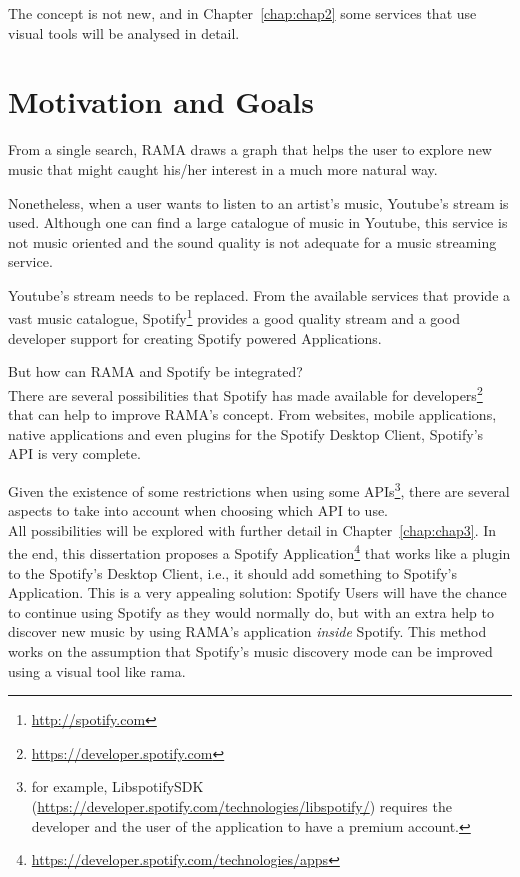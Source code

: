   The concept is not new, and in Chapter~\ref{chap:chap2} some services that use visual tools will be analysed in detail.


\section{Motivation and Goals} \label{sec:goals}

  From a single search, RAMA draws a graph that helps the user to explore new music that might caught his/her interest in a much more natural way.

  Nonetheless, when a user wants to listen to an artist's music, Youtube's stream is used.
  Although one can find a large catalogue of music in Youtube, this service is not music oriented and the sound quality is not adequate for a music streaming service.

  Youtube's stream needs to be replaced.
  From the available services that provide a vast music catalogue, Spotify\footnote{\url{http://spotify.com}} provides a good quality stream and a good developer support for creating Spotify powered Applications.

  But how can RAMA and Spotify be integrated? \\

  There are several possibilities that Spotify has made available for developers\footnote{\url{https://developer.spotify.com}} that can help to improve RAMA's concept.
  From websites, mobile applications, native applications and even plugins for the Spotify Desktop Client, Spotify's API is very complete.

  Given the existence of some restrictions when using some APIs\footnote{for example, LibspotifySDK (\url{https://developer.spotify.com/technologies/libspotify/}) requires the developer and the user of the application to have a premium account.}, there are several aspects to take into account when choosing which API to use. \\

  All possibilities will be explored with further detail in Chapter~\ref{chap:chap3}.
  In the end, this dissertation proposes a Spotify Application\footnote{\url{https://developer.spotify.com/technologies/apps}} that works like a plugin to the Spotify's Desktop Client, i.e., it should add something to Spotify's Application.
  This is a very appealing solution: Spotify Users will have the chance to continue using Spotify as they would normally do, but with an extra help to discover new music by using RAMA's application \emph{inside} Spotify. 
  This method works on the assumption that Spotify's music discovery mode can be improved using a visual tool like rama. \\

